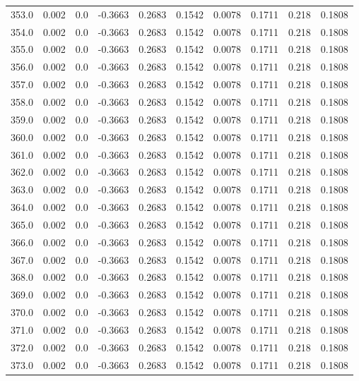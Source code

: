 \begin{longtable}{lrrrrrrrrr}
353.0 & 0.002 & 0.0 & -0.3663 & 0.2683 & 0.1542 & 0.0078 & 0.1711 & 0.218 & 0.1808 \\
354.0 & 0.002 & 0.0 & -0.3663 & 0.2683 & 0.1542 & 0.0078 & 0.1711 & 0.218 & 0.1808 \\
355.0 & 0.002 & 0.0 & -0.3663 & 0.2683 & 0.1542 & 0.0078 & 0.1711 & 0.218 & 0.1808 \\
356.0 & 0.002 & 0.0 & -0.3663 & 0.2683 & 0.1542 & 0.0078 & 0.1711 & 0.218 & 0.1808 \\
357.0 & 0.002 & 0.0 & -0.3663 & 0.2683 & 0.1542 & 0.0078 & 0.1711 & 0.218 & 0.1808 \\
358.0 & 0.002 & 0.0 & -0.3663 & 0.2683 & 0.1542 & 0.0078 & 0.1711 & 0.218 & 0.1808 \\
359.0 & 0.002 & 0.0 & -0.3663 & 0.2683 & 0.1542 & 0.0078 & 0.1711 & 0.218 & 0.1808 \\
360.0 & 0.002 & 0.0 & -0.3663 & 0.2683 & 0.1542 & 0.0078 & 0.1711 & 0.218 & 0.1808 \\
361.0 & 0.002 & 0.0 & -0.3663 & 0.2683 & 0.1542 & 0.0078 & 0.1711 & 0.218 & 0.1808 \\
362.0 & 0.002 & 0.0 & -0.3663 & 0.2683 & 0.1542 & 0.0078 & 0.1711 & 0.218 & 0.1808 \\
363.0 & 0.002 & 0.0 & -0.3663 & 0.2683 & 0.1542 & 0.0078 & 0.1711 & 0.218 & 0.1808 \\
364.0 & 0.002 & 0.0 & -0.3663 & 0.2683 & 0.1542 & 0.0078 & 0.1711 & 0.218 & 0.1808 \\
365.0 & 0.002 & 0.0 & -0.3663 & 0.2683 & 0.1542 & 0.0078 & 0.1711 & 0.218 & 0.1808 \\
366.0 & 0.002 & 0.0 & -0.3663 & 0.2683 & 0.1542 & 0.0078 & 0.1711 & 0.218 & 0.1808 \\
367.0 & 0.002 & 0.0 & -0.3663 & 0.2683 & 0.1542 & 0.0078 & 0.1711 & 0.218 & 0.1808 \\
368.0 & 0.002 & 0.0 & -0.3663 & 0.2683 & 0.1542 & 0.0078 & 0.1711 & 0.218 & 0.1808 \\
369.0 & 0.002 & 0.0 & -0.3663 & 0.2683 & 0.1542 & 0.0078 & 0.1711 & 0.218 & 0.1808 \\
370.0 & 0.002 & 0.0 & -0.3663 & 0.2683 & 0.1542 & 0.0078 & 0.1711 & 0.218 & 0.1808 \\
371.0 & 0.002 & 0.0 & -0.3663 & 0.2683 & 0.1542 & 0.0078 & 0.1711 & 0.218 & 0.1808 \\
372.0 & 0.002 & 0.0 & -0.3663 & 0.2683 & 0.1542 & 0.0078 & 0.1711 & 0.218 & 0.1808 \\
373.0 & 0.002 & 0.0 & -0.3663 & 0.2683 & 0.1542 & 0.0078 & 0.1711 & 0.218 & 0.1808 \\

\end{longtable}
